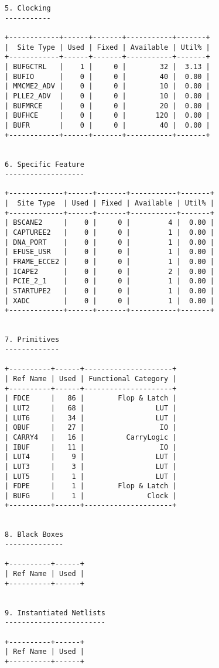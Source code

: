 \documentclass [a4paper, 12pt]{article}
\begin{document}
\begin{lstlisting}[breaklines, basicstyle=\tiny]
5. Clocking
-----------

+------------+------+-------+-----------+-------+
|  Site Type | Used | Fixed | Available | Util% |
+------------+------+-------+-----------+-------+
| BUFGCTRL   |    1 |     0 |        32 |  3.13 |
| BUFIO      |    0 |     0 |        40 |  0.00 |
| MMCME2_ADV |    0 |     0 |        10 |  0.00 |
| PLLE2_ADV  |    0 |     0 |        10 |  0.00 |
| BUFMRCE    |    0 |     0 |        20 |  0.00 |
| BUFHCE     |    0 |     0 |       120 |  0.00 |
| BUFR       |    0 |     0 |        40 |  0.00 |
+------------+------+-------+-----------+-------+


6. Specific Feature
-------------------

+-------------+------+-------+-----------+-------+
|  Site Type  | Used | Fixed | Available | Util% |
+-------------+------+-------+-----------+-------+
| BSCANE2     |    0 |     0 |         4 |  0.00 |
| CAPTUREE2   |    0 |     0 |         1 |  0.00 |
| DNA_PORT    |    0 |     0 |         1 |  0.00 |
| EFUSE_USR   |    0 |     0 |         1 |  0.00 |
| FRAME_ECCE2 |    0 |     0 |         1 |  0.00 |
| ICAPE2      |    0 |     0 |         2 |  0.00 |
| PCIE_2_1    |    0 |     0 |         1 |  0.00 |
| STARTUPE2   |    0 |     0 |         1 |  0.00 |
| XADC        |    0 |     0 |         1 |  0.00 |
+-------------+------+-------+-----------+-------+


7. Primitives
-------------

+----------+------+---------------------+
| Ref Name | Used | Functional Category |
+----------+------+---------------------+
| FDCE     |   86 |        Flop & Latch |
| LUT2     |   68 |                 LUT |
| LUT6     |   34 |                 LUT |
| OBUF     |   27 |                  IO |
| CARRY4   |   16 |          CarryLogic |
| IBUF     |   11 |                  IO |
| LUT4     |    9 |                 LUT |
| LUT3     |    3 |                 LUT |
| LUT5     |    1 |                 LUT |
| FDPE     |    1 |        Flop & Latch |
| BUFG     |    1 |               Clock |
+----------+------+---------------------+


8. Black Boxes
--------------

+----------+------+
| Ref Name | Used |
+----------+------+


9. Instantiated Netlists
------------------------

+----------+------+
| Ref Name | Used |
+----------+------+




\end{lstlisting}
\restoregeometry
\end{document}
